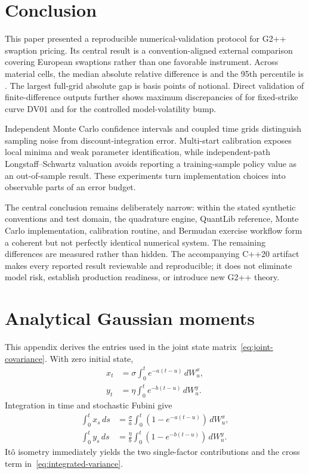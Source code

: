 \documentclass[11pt]{article}
\numberwithin{equation}{section}
\theoremstyle{definition}
\theoremstyle{remark}
\begin{document}
\section{Conclusion}

This paper presented a reproducible numerical-validation protocol for G2++
swaption pricing. Its central result is a convention-aligned external comparison
covering \QuantLibGridCells{} European swaptions rather than one favorable
instrument. Across material cells, the median absolute relative difference is
\QuantLibGridMedianRelativeError{} and the 95th percentile is
\QuantLibGridNinetyFifthRelativeError. The largest full-grid absolute gap is
\QuantLibGridMaxDifferenceBp{} basis points of notional. Direct validation of
finite-difference outputs further shows maximum discrepancies of
\RiskMaxDVOneDifference{} for fixed-strike curve DV01 and
\RiskMaxVolatilityDifference{} for the controlled model-volatility bump.

Independent Monte Carlo confidence intervals and coupled time grids distinguish
sampling noise from discount-integration error. Multi-start calibration exposes
local minima and weak parameter identification, while independent-path
Longstaff--Schwartz valuation avoids reporting a training-sample policy value as
an out-of-sample result. These experiments turn implementation choices into
observable parts of an error budget.

The central conclusion remains deliberately narrow: within the stated synthetic
conventions and test domain, the quadrature engine, QuantLib reference, Monte
Carlo implementation, calibration routine, and Bermudan exercise workflow form
a coherent but not perfectly identical numerical system. The remaining
differences are measured rather than hidden. The accompanying C++20 artifact
makes every reported result reviewable and reproducible; it does not eliminate
model risk, establish production readiness, or introduce new G2++ theory.

\clearpage
\appendix

\section{Analytical Gaussian moments}
\label{app:moments}

This appendix derives the entries used in the joint state
matrix~\eqref{eq:joint-covariance}. With zero initial state,
\begin{align}
  x_t&=\sigma\int_0^t e^{-a(t-u)}\,dW_u^x,\\
  y_t&=\eta\int_0^t e^{-b(t-u)}\,dW_u^y.
\end{align}
Integration in time and stochastic Fubini give
\begin{align}
  \int_0^t x_s\,ds
  &=\frac{\sigma}{a}\int_0^t
    (1-e^{-a(t-u)})\,dW_u^x,\\
  \int_0^t y_s\,ds
  &=\frac{\eta}{b}\int_0^t
    (1-e^{-b(t-u)})\,dW_u^y.
\end{align}
It\^o isometry immediately yields the two single-factor contributions and the
cross term in~\eqref{eq:integrated-variance}.
\end{document}
